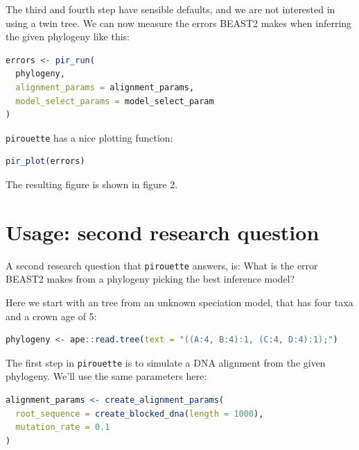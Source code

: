 \documentclass{article}
\begin{document}
The third and fourth step have sensible defaults, and we are not
interested in using a twin tree. We can now measure the errors BEAST2
makes when inferring the given phylogeny like this:

\begin{lstlisting}[language=R, floatplacement=H]
errors <- pir_run(
  phylogeny,
  alignment_params = alignment_params,
  model_select_params = model_select_param
)
\end{lstlisting}

\verb;pirouette; has a nice plotting function:

\begin{lstlisting}[language=R, floatplacement=H]
pir_plot(errors)
\end{lstlisting}

The resulting figure is shown in figure 2.

\section{Usage: second research question}

A second research question that \verb;pirouette; answers, is:
What is the error BEAST2 makes from a phylogeny 
picking the best inference model?

Here we start with an tree from an unknown speciation model,
that has four taxa and a crown age of 5:

\begin{lstlisting}[language=R, floatplacement=H]
phylogeny <- ape::read.tree(text = "((A:4, B:4):1, (C:4, D:4):1);")
\end{lstlisting}

The first step in \verb;pirouette; is to simulate a DNA alignment from the 
given phylogeny. We'll use the same parameters here:

\begin{lstlisting}[language=R, floatplacement=H]
alignment_params <- create_alignment_params(
  root_sequence = create_blocked_dna(length = 1000),
  mutation_rate = 0.1
)
\end{lstlisting}
\end{document}
